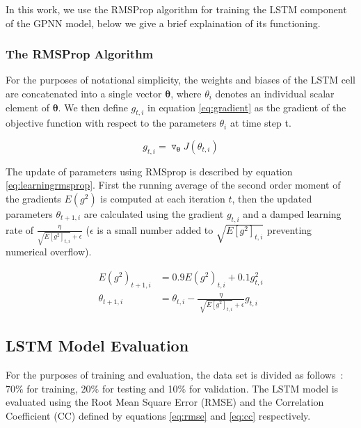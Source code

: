 In this work, we use the RMSProp algorithm for training the LSTM component of the GPNN model, below we give 
a brief explaination of its functioning.

\subsubsection*{The RMSProp Algorithm}

For the purposes of notational simplicity, the weights and biases of the LSTM cell are concatenated into a 
single vector $\mathbf{\theta}$, where $\theta_i$ denotes an individual scalar element of $\mathbf{\theta}$. 
We then define \( g_{t,i} \) in equation \ref{eq:gradient} as the gradient of the objective function with respect 
to the parameters \(   \theta_{i} \) at time step t. 

\begin{equation}\label{eq:gradient}
 g_{t,i} = \triangledown_{ \mathbf{\theta} } J \left(  \theta_{t,i} \right)
\end{equation}

The update of parameters using RMSprop is described by equation \ref{eq:learningrmsprop}. First the running average 
of the second order moment of the gradients \( E \left( g^{2} \right)  \) is computed at each iteration $t$, then 
the updated parameters $\theta_{t+1,i}$ are calculated using the gradient $g_{t,i}$ and a damped learning rate of 
$\frac{\eta}{\sqrt{E \left[ g^{2} \right]_{t,i}} + \epsilon }$ ($\epsilon$ is a small number added to 
$\sqrt{E \left[ g^{2} \right]_{t,i}}$ preventing numerical overflow).


\begin{align}\label{eq:learningrmsprop}
 E \left( g^{2} \right)_{t+1,i} &= 0.9 E \left( g^{2} \right)_{t,i} + 0.1 g_{t,i}^{2}  \\ 
 \theta_{t+1,i} &= \theta_{t,i} - \frac{ \eta }{\sqrt[]{E \left[ g^{2} \right]_{t,i}} + \epsilon } g_{t,i}
\end{align}


\subsection{LSTM Model Evaluation}

For the purposes of training and evaluation, the data set is divided as follows : 70$\%$ for training, 20$\%$  
for testing and 10$\%$ for validation. The LSTM model is evaluated using the Root Mean Square Error (RMSE) 
and the Correlation Coefficient (CC) defined by equations \ref{eq:rmse} and \ref{eq:cc} respectively. 


